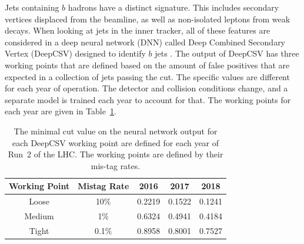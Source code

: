 Jets containing $b$ hadrons have a distinct signature.
This includes secondary vertices displaced from the beamline,
as well as non-isolated leptons from weak decays.
When looking at jets in the inner tracker,
all of these features are considered in a deep neural network (DNN)
called Deep Combined Secondary Vertex (DeepCSV)
designed to identify $b$ jets \cite{Sirunyan_2018}.
The output of DeepCSV has three working points
that are defined based on the amount of false positives that are expected
in a collection of jets passing the cut.
The specific values are different for each year of operation.
The detector and collision conditions change,
and a separate model is trained each year to account for that.
The working points for each year are given in Table~\ref{tab:deepcsv}.
\begin{table}
  \centering
  \caption[DeepCSV working points]{
    The minimal cut value on the neural network output for each DeepCSV working point
    are defined for each year of Run~2 of the LHC.
    The working points are defined by their mis-tag rates.
  }
  {\renewcommand{\arraystretch}{1.5}
  \begin{tabular}{|c | c | c c c|}
    \hline
    Working Point & Mistag Rate & 2016 & 2017 & 2018 \\
    \hline
    Loose  &  10\% & 0.2219 & 0.1522 & 0.1241 \\
    Medium &   1\% & 0.6324 & 0.4941 & 0.4184 \\
    Tight  & 0.1\% & 0.8958 & 0.8001 & 0.7527 \\
    \hline
  \end{tabular}
  }
  \label{tab:deepcsv}
\end{table}

